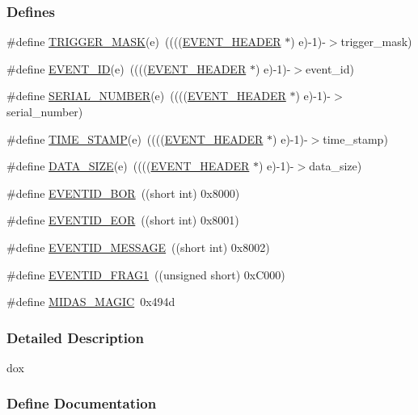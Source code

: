 \subsubsection*{Defines}
\begin{DoxyCompactItemize}
\item 
\#define \hyperlink{group__mbufferh_ga6a0d6be5b8aad5a907d5b880bae93eb9}{TRIGGER\_\-MASK}(e)~((((\hyperlink{structEVENT__HEADER}{EVENT\_\-HEADER} $\ast$) e)-\/1)-\/$>$trigger\_\-mask)
\item 
\#define \hyperlink{group__mbufferh_gaf42c9a1ac33cf459bfd366673f6a4d70}{EVENT\_\-ID}(e)~((((\hyperlink{structEVENT__HEADER}{EVENT\_\-HEADER} $\ast$) e)-\/1)-\/$>$event\_\-id)
\item 
\#define \hyperlink{group__mbufferh_gadbb75a9d81e264e357bc5fc73dd4ebb8}{SERIAL\_\-NUMBER}(e)~((((\hyperlink{structEVENT__HEADER}{EVENT\_\-HEADER} $\ast$) e)-\/1)-\/$>$serial\_\-number)
\item 
\#define \hyperlink{group__mbufferh_gae8d2f03c283637c81cdcfd3fda065d53}{TIME\_\-STAMP}(e)~((((\hyperlink{structEVENT__HEADER}{EVENT\_\-HEADER} $\ast$) e)-\/1)-\/$>$time\_\-stamp)
\item 
\#define \hyperlink{group__mbufferh_ga5327bc310729f5ec36b917ed13e6ff66}{DATA\_\-SIZE}(e)~((((\hyperlink{structEVENT__HEADER}{EVENT\_\-HEADER} $\ast$) e)-\/1)-\/$>$data\_\-size)
\item 
\#define \hyperlink{group__mbufferh_gaea58a47233f988dd2f9a0320d99734dc}{EVENTID\_\-BOR}~((short int) 0x8000)
\item 
\#define \hyperlink{group__mbufferh_ga8f46d90b4c90a2387685d422625c654f}{EVENTID\_\-EOR}~((short int) 0x8001)
\item 
\#define \hyperlink{group__mbufferh_ga7fefe6ad78331e8cfb3d2b31dbfdd2d0}{EVENTID\_\-MESSAGE}~((short int) 0x8002)
\item 
\#define \hyperlink{group__mbufferh_gaae07538917933e32355933ac1e2e3d60}{EVENTID\_\-FRAG1}~((unsigned short) 0xC000)
\item 
\#define \hyperlink{group__mbufferh_ga028a14f85456b68bf2babd1bdcaa1abb}{MIDAS\_\-MAGIC}~0x494d
\end{DoxyCompactItemize}


\subsubsection{Detailed Description}
dox 

\subsubsection{Define Documentation}
